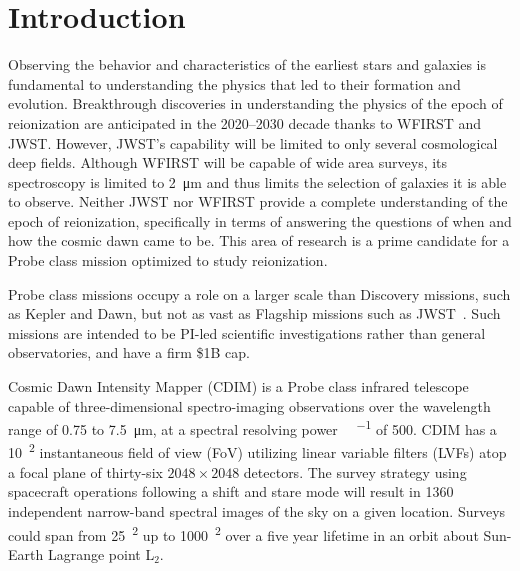 \documentclass{ws-jai}
\begin{document}
\section{Introduction}
\label{sec:introduction}
Observing the behavior and characteristics of the earliest stars and galaxies is fundamental to understanding the physics that led to their formation and evolution.
Breakthrough discoveries in understanding the physics of the epoch of reionization are anticipated in the 2020--2030 decade thanks to WFIRST and JWST\@.
However, JWST's capability will be limited to only several cosmological deep fields.
Although WFIRST will be capable of wide area surveys, its spectroscopy is limited to \SI{2}{\micro\meter} and thus limits the selection of galaxies it is able to observe.
Neither JWST nor WFIRST provide a complete understanding of the epoch of reionization, specifically in terms of answering the questions of when and how the cosmic dawn came to be.
This area of research is a prime candidate for a Probe class mission optimized to study reionization.


Probe class missions occupy a role on a larger scale than Discovery missions, such as Kepler and Dawn, but not as vast as Flagship missions such as JWST~\cite{probeclasswp}.
Such missions are intended to be PI-led scientific investigations rather than general observatories, and have a firm \$1B cap.

Cosmic Dawn Intensity Mapper (CDIM) is a Probe class infrared telescope capable of three-dimensional spectro-imaging observations over the wavelength range of 0.75 to \SI{7.5}{\micro\meter}, at a spectral resolving power \si{\Delta\lambda\per\lambda} of 500.
CDIM has a \SI{10}{\deg\squared} instantaneous field of view (FoV) utilizing linear variable filters (LVFs) atop a focal plane of thirty-six $2048\times2048$ detectors.
The survey strategy using spacecraft operations following a shift and stare mode will result in 1360 independent narrow-band spectral images of the sky on a given location.
Surveys could span from \SI{25}{\deg\squared} up to \SI{1000}{\deg\squared} over a five year lifetime in an orbit about Sun-Earth Lagrange point L$_{2}$\@.
\end{document}
